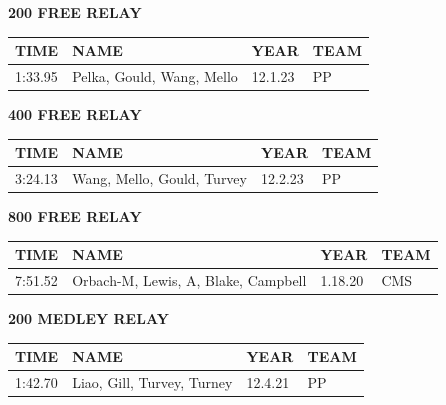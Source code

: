 \begin{table}[H]
\centering
\begin{minipage}[t]{0.6\textwidth}
\centering
\textbf{200 FREE RELAY}\\[0.1cm]
\begin{tabular}{@{}p{1.8cm}p{2.8cm}p{1.2cm}p{1.4cm}@{}}
\hline
    \textbf{TIME} & \textbf{NAME} & \textbf{YEAR} & \textbf{TEAM} \\
\hline
    1:33.95 & Pelka, Gould, Wang, Mello & 12.1.23 & PP \\
\hline
\end{tabular}
\end{minipage}
\end{table}

\begin{table}[H]
\centering
\begin{minipage}[t]{0.6\textwidth}
\centering
\textbf{400 FREE RELAY}\\[0.1cm]
\begin{tabular}{@{}p{1.8cm}p{2.8cm}p{1.2cm}p{1.4cm}@{}}
\hline
    \textbf{TIME} & \textbf{NAME} & \textbf{YEAR} & \textbf{TEAM} \\
\hline
    3:24.13 & Wang, Mello, Gould, Turvey & 12.2.23 & PP \\
\hline
\end{tabular}
\end{minipage}
\end{table}

\begin{table}[H]
\centering
\begin{minipage}[t]{0.6\textwidth}
\centering
\textbf{800 FREE RELAY}\\[0.1cm]
\begin{tabular}{@{}p{1.8cm}p{2.8cm}p{1.2cm}p{1.4cm}@{}}
\hline
    \textbf{TIME} & \textbf{NAME} & \textbf{YEAR} & \textbf{TEAM} \\
\hline
    7:51.52 & Orbach-M, Lewis, A, Blake, Campbell & 1.18.20 & CMS \\
\hline
\end{tabular}
\end{minipage}
\end{table}

\begin{table}[H]
\centering
\begin{minipage}[t]{0.6\textwidth}
\centering
\textbf{200 MEDLEY RELAY}\\[0.1cm]
\begin{tabular}{@{}p{1.8cm}p{2.8cm}p{1.2cm}p{1.4cm}@{}}
\hline
    \textbf{TIME} & \textbf{NAME} & \textbf{YEAR} & \textbf{TEAM} \\
\hline
    1:42.70 & Liao, Gill, Turvey, Turney & 12.4.21 & PP \\
\hline
\end{tabular}
\end{minipage}
\end{table}

